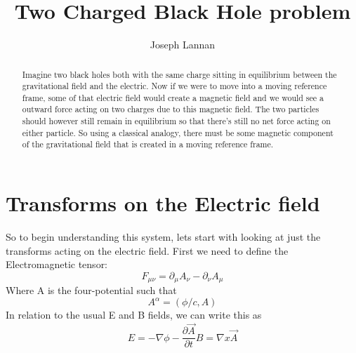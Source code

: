 \documentclass{article}
\begin{document}
\title{Two Charged Black Hole problem}
\author{Joseph Lannan}

\maketitle

\begin{abstract}
Imagine two black holes both with the same charge sitting in equilibrium between the gravitational field and the electric. Now if we were to move into a moving reference frame, some of that electric field would create a magnetic field and we would see a outward force acting on two charges due to this magnetic field. The two particles should however still remain in equilibrium so that there's still no net force acting on either particle. So using a classical analogy, there must be some magnetic component of the gravitational field that is created in a moving reference frame. 
\end{abstract}

\section{Transforms on the Electric field}
So to begin understanding this system, lets start with looking at just the transforms acting on the electric field. First we need to define the Electromagnetic tensor:
\begin{equation}
	F_{\mu \nu} = \partial_\mu A_\nu - \partial_\nu A_\mu
\end{equation}
Where A is the four-potential such that
\begin{equation}
	A^\alpha = (\phi/c,A)
\end{equation}
In relation to the usual E and B fields, we can write this as
\begin{equation}
	E = - \nabla \phi - \frac{\partial \vec{A}}{\partial t}
	B = \nabla x \vec{A}
\end{equation}
\end{document}
